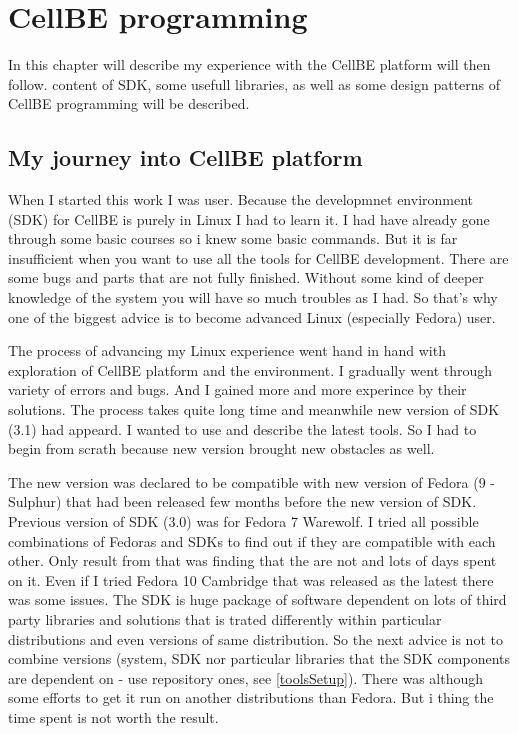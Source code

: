 \chapter {CellBE programming} 
\par
In this chapter will describe my experience with the CellBE platform will then follow. content of SDK, some usefull libraries, as well as some design patterns of CellBE programming will be described.

\section{My journey into CellBE platform}
\par
When I started this work I was  user. Because the developmnet environment (SDK) for CellBE is purely in Linux I had to learn it. I had have already gone through some basic courses so i knew some basic commands. But it is far insufficient when you want to use all the tools for CellBE development. There are some bugs and parts that are not fully finished. Without some kind of deeper knowledge of the system you will have so much troubles as I had. So that's why one of the biggest advice is to become advanced Linux (especially Fedora) user.

\par
The process of advancing my Linux experience went hand in hand with exploration of CellBE platform and the environment. I gradually went through variety of errors and bugs. And I gained more and more experince by their solutions. The process takes quite long time and meanwhile new version of SDK (3.1) had appeard. I wanted to use and describe the latest tools. So I had to begin from scrath because new version brought new obstacles as well.

\par
The new version was declared to be compatible with new version of Fedora (9 - Sulphur) that had been released few months before the new version of SDK. Previous version of SDK (3.0) was for Fedora 7 Warewolf. I tried all possible combinations of Fedoras and SDKs to find out if they are compatible with each other. Only result from that was finding that the are not and lots of days spent on it. Even if I tried Fedora 10 Cambridge that was released as the latest there was some issues. The SDK is huge package of software dependent on lots of third party libraries and solutions that is trated differently within particular distributions and even versions of same distribution. So the next advice is not to combine versions (system, SDK nor particular libraries that the SDK components are dependent on - use repository ones, see \ref{toolsSetup}). There was although some efforts to get it run on another distributions than Fedora. But i thing the time spent is not worth the result.


